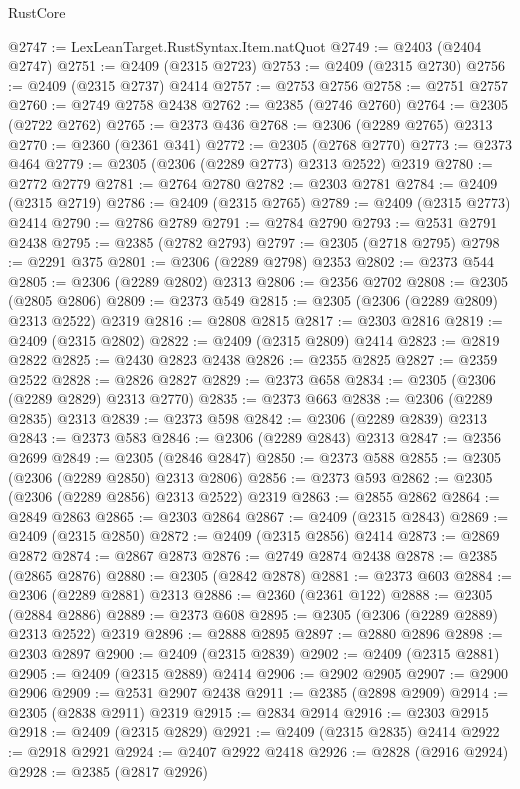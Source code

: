 \begin{lexlean}{RustCore}
\begin{coremodule}
@2747 := LexLeanTarget.RustSyntax.Item.natQuot
@2749 := @2403 (@2404 @2747)
@2751 := @2409 (@2315 @2723)
@2753 := @2409 (@2315 @2730)
@2756 := @2409 (@2315 @2737) @2414
@2757 := @2753 @2756
@2758 := @2751 @2757
@2760 := @2749 @2758 @2438
@2762 := @2385 (@2746 @2760)
@2764 := @2305 (@2722 @2762)
@2765 := @2373 @436
@2768 := @2306 (@2289 @2765) @2313
@2770 := @2360 (@2361 @341)
@2772 := @2305 (@2768 @2770)
@2773 := @2373 @464
@2779 := @2305 (@2306 (@2289 @2773) @2313 @2522) @2319
@2780 := @2772 @2779
@2781 := @2764 @2780
@2782 := @2303 @2781
@2784 := @2409 (@2315 @2719)
@2786 := @2409 (@2315 @2765)
@2789 := @2409 (@2315 @2773) @2414
@2790 := @2786 @2789
@2791 := @2784 @2790
@2793 := @2531 @2791 @2438
@2795 := @2385 (@2782 @2793)
@2797 := @2305 (@2718 @2795)
@2798 := @2291 @375
@2801 := @2306 (@2289 @2798) @2353
@2802 := @2373 @544
@2805 := @2306 (@2289 @2802) @2313
@2806 := @2356 @2702
@2808 := @2305 (@2805 @2806)
@2809 := @2373 @549
@2815 := @2305 (@2306 (@2289 @2809) @2313 @2522) @2319
@2816 := @2808 @2815
@2817 := @2303 @2816
@2819 := @2409 (@2315 @2802)
@2822 := @2409 (@2315 @2809) @2414
@2823 := @2819 @2822
@2825 := @2430 @2823 @2438
@2826 := @2355 @2825
@2827 := @2359 @2522
@2828 := @2826 @2827
@2829 := @2373 @658
@2834 := @2305 (@2306 (@2289 @2829) @2313 @2770)
@2835 := @2373 @663
@2838 := @2306 (@2289 @2835) @2313
@2839 := @2373 @598
@2842 := @2306 (@2289 @2839) @2313
@2843 := @2373 @583
@2846 := @2306 (@2289 @2843) @2313
@2847 := @2356 @2699
@2849 := @2305 (@2846 @2847)
@2850 := @2373 @588
@2855 := @2305 (@2306 (@2289 @2850) @2313 @2806)
@2856 := @2373 @593
@2862 := @2305 (@2306 (@2289 @2856) @2313 @2522) @2319
@2863 := @2855 @2862
@2864 := @2849 @2863
@2865 := @2303 @2864
@2867 := @2409 (@2315 @2843)
@2869 := @2409 (@2315 @2850)
@2872 := @2409 (@2315 @2856) @2414
@2873 := @2869 @2872
@2874 := @2867 @2873
@2876 := @2749 @2874 @2438
@2878 := @2385 (@2865 @2876)
@2880 := @2305 (@2842 @2878)
@2881 := @2373 @603
@2884 := @2306 (@2289 @2881) @2313
@2886 := @2360 (@2361 @122)
@2888 := @2305 (@2884 @2886)
@2889 := @2373 @608
@2895 := @2305 (@2306 (@2289 @2889) @2313 @2522) @2319
@2896 := @2888 @2895
@2897 := @2880 @2896
@2898 := @2303 @2897
@2900 := @2409 (@2315 @2839)
@2902 := @2409 (@2315 @2881)
@2905 := @2409 (@2315 @2889) @2414
@2906 := @2902 @2905
@2907 := @2900 @2906
@2909 := @2531 @2907 @2438
@2911 := @2385 (@2898 @2909)
@2914 := @2305 (@2838 @2911) @2319
@2915 := @2834 @2914
@2916 := @2303 @2915
@2918 := @2409 (@2315 @2829)
@2921 := @2409 (@2315 @2835) @2414
@2922 := @2918 @2921
@2924 := @2407 @2922 @2418
@2926 := @2828 (@2916 @2924)
@2928 := @2385 (@2817 @2926)

\end{coremodule}
\end{lexlean}
